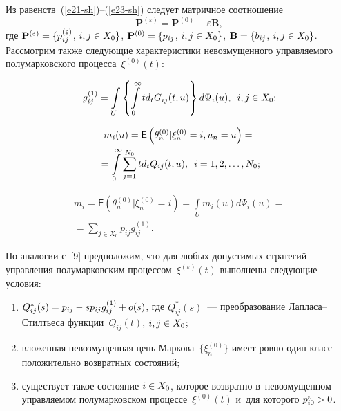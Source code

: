 \begin{multicols}{2}
\vspace*{-2pt}

\noindent
Из равенств~(\ref{e21-sh})--(\ref{e23-sh}) следует мат\-рич\-ное соотношение
\begin{equation*}
\mathbf{P}^{(\varepsilon )}=\mathbf{P}^{(0)}-\varepsilon \mathbf{B},
\end{equation*}
где ${\bf P}^{(\varepsilon )} \hm=\{p_{ij}^{(\varepsilon )}$, $i,j\hm\in X_{0} \}$, 
${\bf P}^{(0)} \hm=\{p_{ij}$, $i,j\hm\in X_{0} \}$, $\mathbf{B}\hm=\{b_{ij}$, 
$i,j\hm\in X_{0} \}$.
Рассмотрим также следующие характеристики невозмущенного управ\-ля\-емо\-го 
полумарковского процесса~$\xi^{(0)}(t)$:

\pagebreak

\noindent
\begin{equation*}
g_{ij}^{(1)} =\int\limits_{U}\left\{\int\limits_{0}^{\infty }td_{t} G_{ij} 
(t,u) \right\}d\Psi _{i} (u),\enskip i,j\in X_{0}; %
\end{equation*}

\vspace*{-14pt}

\noindent
\begin{multline}
m_{i} (u)= \mathsf{E}\left(\theta_{n}^{(0)} | \xi_{n}^{(0)} =i, u_n=u 
\right)={}\\
{}=\int\limits_{0}^{\infty }\sum\limits_{j=1}^{N_0}td_{t} Q_{ij} (t,u), \enskip 
i=1,2,\dots ,N_0;
\label{e25-sh}
\end{multline}

\vspace*{-14pt}

\noindent
\begin{multline}
m_{i} =\mathsf{E}\left(\theta_{n}^{(0)} | \xi_{n}^{(0)} =i 
\right)=\int\limits_{U}m_i(u)d\Psi_{i} (u) ={}\\
{}=\sum\limits_{j \in X_{0} }p_{ij} 
g_{ij}^{(1)}. \label{e26-sh}
\end{multline}

\vspace*{-2pt}

\noindent
По аналогии с~[9] предположим, что для любых допустимых стратегий управления 
полумарковским процессом~$\xi^{(\varepsilon)} (t)$ выполнены следующие 
условия:
\begin{enumerate}[(1)]
\item  $Q_{ij}^{*} (s)=p_{ij}\hm - sp_{ij} g_{ij}^{(1)} \hm+o(s)$, где $Q_{ij}^{*} 
(s)$~--- преобразование Лап\-ла\-са--Стилть\-еса функции~$Q_{ij} (t)$, $i,j\hm\in X_0$;
\item  вложенная невозмущенная цепь Маркова~$\{\xi _{n}^{(0)} \}$ имеет 
ровно один класс положительно возвратных состояний;
\item  существует такое состояние $i \hm\in X_{0}$, которое возвратно 
в~невозмущенном управ\-ля\-емом  полумарковском процессе~$\xi ^{(0)} (t)$ и~для 
которого $p_{i0}^{\varepsilon }\hm >0$.
\end{enumerate}


\end{multicols}
